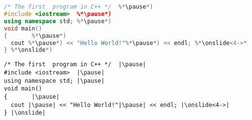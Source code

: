 \documentclass[aspectratio=1610, english]{beamer}
\begin{document}
\section{}
\subsection*{}
\begin{frame}[fragile]{}
	\begin{lstlisting}[language=C++]
/* The first  program in C++ */  %*\pause*)
#include <iostream>  %*\pause*)
using namespace std; %*\pause*)
void main() 
{       %*\pause*)
  cout %*\pause*) << "Hello World!"%*\pause*) << endl; %*\onslide<4->*)
} %*\onslide*)
\end{lstlisting}
\end{frame}
\begin{frame}[fragile]{}
	\begin{verbatim}
/* The first  program in C++ */  |\pause|
#include <iostream>  |\pause|
using namespace std; |\pause|
void main() 
{       |\pause|
  cout |\pause| << "Hello World!"|\pause| << endl; |\onslide<4->|
} |\onslide|
	\end{verbatim}
\end{frame}
\appendix
\end{document}
